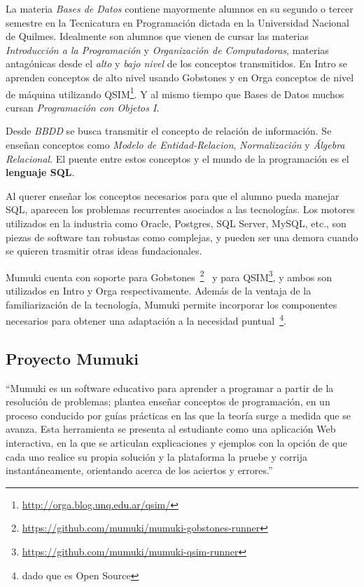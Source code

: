 
La materia \textit{Bases de Datos} contiene mayormente
alumnos en su segundo o tercer semestre en
la Tecnicatura en Programación dictada en la Universidad
Nacional de Quilmes. Idealmente son alumnos que
vienen de cursar las materias \textit{Introducción
a la Programación} y \textit{Organización de Computadoras},
materias antagónicas desde el \textit{alto} y \textit{bajo nivel}
de los conceptos transmitidos. En Intro se aprenden conceptos
de alto nivel usando Gobstones y en Orga conceptos de nivel
de máquina utilizando QSIM\footnote{\url{http://orga.blog.unq.edu.ar/qsim/}}.
Y al mismo tiempo que Bases de Datos muchos cursan
\textit{Programación con Objetos I}.

Desde \textit{BBDD} se busca transmitir el concepto de relación
de información. Se enseñan conceptos como \textit{Modelo de
Entidad-Relacion}, \textit{Normalización} y \textit{Álgebra Relacional}.
El puente entre estos conceptos y el mundo de la programación
es el \textbf{lenguaje SQL}.

Al querer enseñar los conceptos necesarios para que el alumno
pueda manejar SQL, aparecen los problemas recurrentes asociados
a las tecnologías. Los motores utilizados en la industria como
Oracle, Postgres, SQL Server, MySQL, etc., son piezas de software
tan robustas como complejas, y pueden ser una demora cuando se
quieren trasmitir otras ideas fundacionales.

Mumuki cuenta con soporte para Gobstones~\footnote{\url{https://github.com/mumuki/mumuki-gobstones-runner}}~\cite{MumukiGobstonesAloi}
y para QSIM\footnote{\url{https://github.com/mumuki/mumuki-qsim-runner}},
y ambos son utilizados en Intro y Orga respectivamente.
Además de la ventaja de la familiarización de la tecnología,
Mumuki permite incorporar los componentes necesarios para
obtener una adaptación a la necesidad puntual~\footnote{dado que
es Open Source}.


\subsection{Proyecto Mumuki}

\begin{displayquote}
``Mumuki es un software educativo para aprender a programar a partir de la resolución de problemas;
plantea enseñar conceptos de programación, en un proceso conducido por guías prácticas
en las que la teoría surge a medida que se avanza. Esta herramienta se presenta al
estudiante como una aplicación Web interactiva, en la que se articulan explicaciones
y ejemplos con la opción de que cada uno realice su propia solución y la plataforma
la pruebe y corrija instantáneamente, orientando acerca de los aciertos y errores.''
\end{displayquote}

